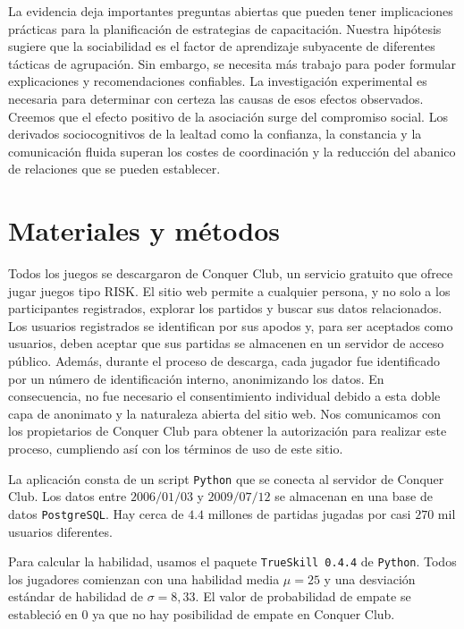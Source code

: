\documentclass[a4paper,11pt]{book}
\theoremstyle{definition}
\begin{document}

La evidencia deja importantes preguntas abiertas que pueden tener implicaciones prácticas para la planificación de estrategias de capacitación.
%
Nuestra hipótesis sugiere que la sociabilidad es el factor de aprendizaje subyacente de diferentes tácticas de agrupación.
%
Sin embargo, se necesita más trabajo para poder formular explicaciones y recomendaciones confiables.
%
La investigación experimental es necesaria para determinar con certeza las causas de esos efectos observados.
%
Creemos que el efecto positivo de la asociación surge del compromiso social.
%
Los derivados sociocognitivos de la lealtad como la confianza, la constancia y la comunicación fluida superan los costes de coordinación y la reducción del abanico de relaciones que se pueden establecer.


\section{Materiales y métodos}

Todos los juegos se descargaron de Conquer Club, un servicio gratuito que ofrece jugar juegos tipo RISK.
%
El sitio web permite a cualquier persona, y no solo a los participantes registrados, explorar los partidos y buscar sus datos relacionados.
%
Los usuarios registrados se identifican por sus apodos y, para ser aceptados como usuarios, deben aceptar que sus partidas se almacenen en un servidor de acceso público.
%
Además, durante el proceso de descarga, cada jugador fue identificado por un número de identificación interno, anonimizando los datos.
%
En consecuencia, no fue necesario el consentimiento individual debido a esta doble capa de anonimato y la naturaleza abierta del sitio web.
%
Nos comunicamos con los propietarios de Conquer Club para obtener la autorización para realizar este proceso, cumpliendo así con los términos de uso de este sitio.


La aplicación consta de un script \texttt{Python} que se conecta al servidor de Conquer Club.
%
Los datos entre $2006/01/03$ y $2009/07/12$ se almacenan en una base de datos \texttt{PostgreSQL}.
Hay cerca de $4.4$ millones de partidas jugadas por casi $270$ mil usuarios diferentes.

Para calcular la habilidad, usamos el paquete \texttt{TrueSkill 0.4.4} de \texttt{Python}.
%
Todos los jugadores comienzan con una habilidad media $\mu = 25$ y una desviación estándar de habilidad de $\sigma = 8,33$.
%
El valor de probabilidad de empate se estableció en 0 ya que no hay posibilidad de empate en Conquer Club.
\end{document}
